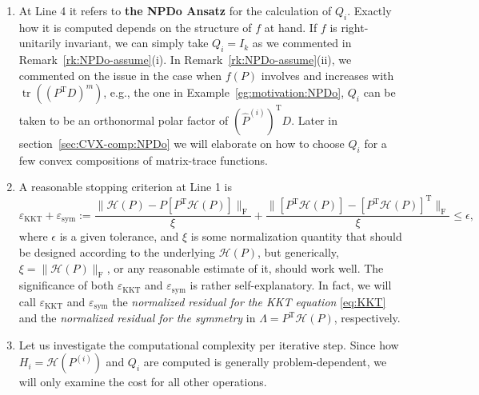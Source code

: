 \documentclass[11pt]{article}
\def\scrH{\mathscr{H}}
\def\what{\widehat}
\DeclareMathOperator{\sym}{sym}
\DeclareMathOperator{\tr}{tr}
\DeclareMathOperator{\F}{F}
\DeclareMathOperator{\T}{T}
\DeclareMathOperator{\KKT}{KKT}
\def\Blue{\textcolor{blue}}
\theoremstyle{definition}
\numberwithin{equation}{section}
\begin{document}
\begin{enumerate}[(1)]
  \item At Line 4 it refers to  {\bf the NPDo Ansatz} for the calculation of $Q_i$.
        Exactly how it is computed depends on the structure of $f$ at hand.
        If $f$ is right-unitarily invariant, we can simply take $Q_i=I_k$ as we commented in Remark~\ref{rk:NPDo-assume}(i).
        In Remark~\ref{rk:NPDo-assume}(ii),
        we commented on  the issue in the case when $f(P)$ involves and increases with $\tr((P^{\T}D)^m)$, e.g., the one in
        Example~\ref{eg:motivation:NPDo}, $Q_i$ can be taken to be
        an orthonormal polar factor of  $(\what P^{(i)})^{\T}D$. Later in section~\ref{sec:CVX-comp:NPDo} we will elaborate
        on how to choose $Q_i$ for a few convex compositions of  matrix-trace functions.
  \item A reasonable stopping criterion at Line 1 is
         \begin{equation}\label{eq:stop-1}
         \varepsilon_{\KKT}+\varepsilon_{\sym}:=\frac {\|\scrH(P)-P[P^{\T}\scrH(P)]\|_{\F}}{\xi}+\frac {\big\|[P^{\T}\scrH(P)]-[P^{\T}\scrH(P)]^{\T}\|_{\F}}{\xi}\le\epsilon,
         \end{equation}
         where $\epsilon$ is a given tolerance, and $\xi$ is some normalization quantity that should be
         designed according to the underlying $\scrH(P)$, but generically, $\xi=\|\scrH(P)\|_{\F}$, or any reasonable estimate of it,
         should work well.
         The significance of both $\varepsilon_{\KKT}$ and $\varepsilon_{\sym}$ is rather self-explanatory. In fact, we
         will call $\varepsilon_{\KKT}$ and $\varepsilon_{\sym}$ the {\em normalized residual for the KKT equation\/} \eqref{eq:KKT}
         and the {\em normalized residual for the symmetry\/} in $\Lambda=P^{\T}\scrH(P)$, respectively.

  \item Let us investigate the computational complexity per iterative step. Since how $H_i=\scrH(P^{(i)})$ and $Q_i$ are computed is generally problem-dependent, we will only examine the cost for all other operations.

\end{enumerate}
\end{document}
